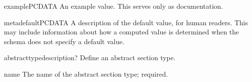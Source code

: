 \documentclass{howto}
\newcommand{\datatype}[1]{\strong{#1}}
\begin{document}
\begin{elementdesc}{example}{PCDATA}
  An example value.  This serves only as documentation.
\end{elementdesc}

\begin{elementdesc}{metadefault}{PCDATA}
  A description of the default value, for human readers.  This may
  include information about how a computed value is determined when
  the schema does not specify a default value.
\end{elementdesc}

\begin{elementdesc}{abstracttype}{description?}
  Define an abstract section type.

  \begin{attributedesc}{name}{\datatype{basic-key}}
    The name of the abstract section type; required.
  \end{attributedesc}
\end{elementdesc}
\end{document}
